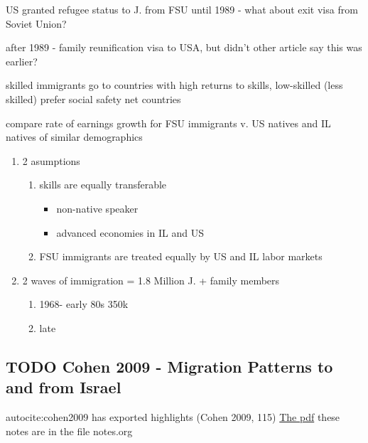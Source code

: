 \documentclass[12pt,twoside]{reedthesis}
\providecommand{\tightlist}{%
  \setlength{\itemsep}{0pt}\setlength{\parskip}{0pt}}
\begin{document}
  US granted refugee status to J. from FSU until 1989 - what about exit
  visa from Soviet Union?
  
  after 1989 - family reunification visa to USA, but didn't other article
  say this was earlier?
  
  skilled immigrants go to countries with high returns to skills,
  low-skilled (less skilled) prefer social safety net countries
  
  compare rate of earnings growth for FSU immigrants v. US natives and IL
  natives of similar demographics
  
  \begin{enumerate}
  \def\labelenumi{\arabic{enumi}.}
  \item
    2 asumptions
  
    \begin{enumerate}
    \def\labelenumii{\arabic{enumii}.}
    \tightlist
    \item
      skills are equally transferable
  
      \begin{itemize}
      \tightlist
      \item
        non-native speaker
      \item
        advanced economies in IL and US
      \end{itemize}
    \item
      FSU immigrants are treated equally by US and IL labor markets
    \end{enumerate}
  \item
    2 waves of immigration = 1.8 Million J. + family members
  
    \begin{enumerate}
    \def\labelenumii{\arabic{enumii}.}
    \tightlist
    \item
      1968- early 80s 350k
    \item
      late
    \end{enumerate}
  \end{enumerate}
  
  \subsection{TODO Cohen 2009 - Migration Patterns to and from
  Israel}\label{todo-cohen-2009---migration-patterns-to-and-from-israel}
  
  autocite:cohen2009 has exported highlights (Cohen 2009, 115)
  \href{file:///Users/AbuDavid/Documents/ThesisDocs/Cohen/2009/Cohen\%20-\%20Migration\%20Patterns\%20to\%20and\%20from\%20Israel\%20-\%202009.pdf}{The
  pdf} these notes are in the file notes.org
  
\end{document}
